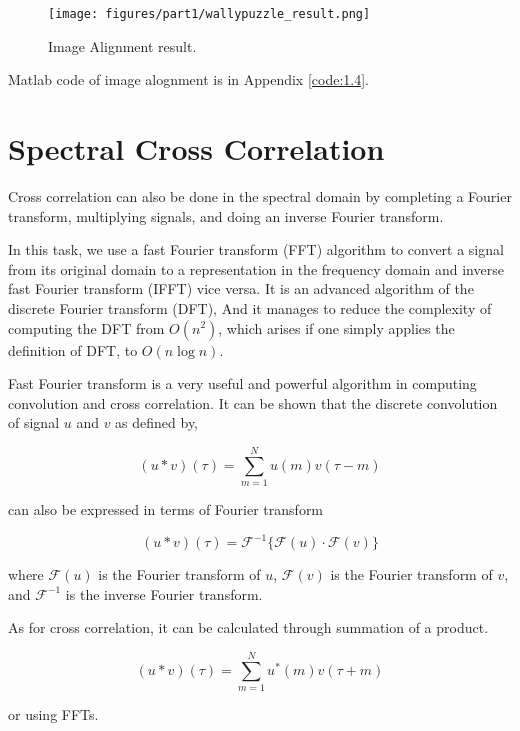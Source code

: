 \begin{figure}[h!]
	\centering
		\texttt{[image: figures/part1/wallypuzzle\_result.png]}
		\caption{Image Alignment result. }
		\label{fig:maze-b}
\end{figure} 

Matlab code of image alognment is in Appendix \ref{code:1.4}.

\section{Spectral Cross Correlation}

Cross correlation can also be done in the spectral domain by completing a Fourier transform, multiplying signals, and doing an inverse Fourier transform.

In this task, we use a fast Fourier transform (FFT) algorithm to convert a signal from its original domain to a representation in the frequency domain and inverse fast Fourier transform (IFFT) vice versa. It is an advanced algorithm of the discrete Fourier transform (DFT), And it manages to reduce the complexity of computing the DFT from $O(n^2)$, which arises if one simply applies the definition of DFT, to $O(n\log n)$.

Fast Fourier transform is a very useful and powerful algorithm in computing convolution and cross correlation. It can be shown that the discrete convolution of signal $u$ and $v$ as defined by,

\begin{equation*}
(u*v)(\tau)=\sum_{m=1}^{N}u(m)v(\tau-m)
\end{equation*}

can also be expressed in terms of Fourier transform

\begin{equation*}
(u*v)(\tau)=\mathcal{F}^{-1}\{\mathcal{F}(u)\cdot \mathcal{F}(v)\}
\end{equation*}

where $\mathcal{F}(u)$ is the Fourier transform of $u$, $\mathcal{F}(v)$ is the Fourier transform of $v$, and $\mathcal{F}^{-1}$ is the inverse Fourier transform.

As for cross correlation, it can be calculated through summation of a product.

\begin{equation*}
(u*v)(\tau)=\sum_{m=1}^{N}u^*(m)v(\tau+m)
\end{equation*}

or using FFTs.

